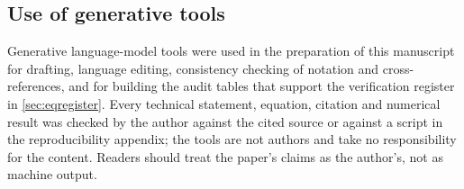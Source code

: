 \subsection*{Use of generative tools}
Generative language-model tools were used in the preparation of this manuscript for drafting,
language editing, consistency checking of notation and cross-references, and for building the audit
tables that support the verification register in \cref{sec:eqregister}. Every technical statement,
equation, citation and numerical result was checked by the author against the cited source or against a
script in the reproducibility appendix; the tools are not authors and take no responsibility for the
content. Readers should treat the paper's claims as the author's, not as machine output.
